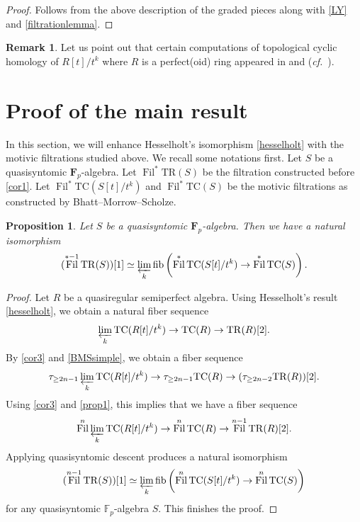 \documentclass[10pt,letterpaper]{amsart}
\numberwithin{figure}{section}
\numberwithin{equation}{section}
\newtheorem{proposition}[figure]{Proposition}
\theoremstyle{definition}
\theoremstyle{definition}
\newtheorem{remark}[figure]{Remark}
\theoremstyle{definition}
\theoremstyle{definition}
\DeclareMathOperator{\Fil}{Fil}
\newcommand{\TR}{\mathrm{TR}}
\newcommand{\TC}{\mathrm{TC}}
\newcommand{\F}{\mathbf{F}}
\begin{document}
\begin{proof}
    Follows from the above description of the graded pieces along with \cref{LY} and \cref{filtrationlemma}. 
\end{proof}{}

\begin{remark}
    Let us point out that certain computations of topological cyclic homology of $R[t]/t^k$ where $R$ is a perfect(oid) ring appeared in \cite{Yuri} and \cite{Noah1} (\textit{cf.}~\cite[Thm.~10.4]{akhill}).
\end{remark}{}


\section{Proof of the main result}\label{finalsec} In this section, we will enhance Hesselholt's isomorphism \cref{hesselholt} with the motivic filtrations studied above. We recall some notations first. Let $S$ be a quasisyntomic $\F_p$-algebra. Let $\Fil^* \TR(S)$ be the filtration constructed before \cref{cor1}. Let $\Fil^*  \TC (S[t]/t^k)$ and $\Fil^* \TC(S)$ be the motivic filtrations as constructed by Bhatt--Morrow--Scholze.



\begin{proposition}\label{mainthm1}
    Let $S$ be a quasisyntomic $\F_p$-algebra. Then  we have a natural isomorphism $$ (\Fil^{*-1} \TR(S))[1] \simeq \varprojlim_k \mathrm{fib} \left(\Fil^* \TC(S[t]/t^k) \to \Fil^* \TC(S)\right).$$
\end{proposition}{}


\begin{proof}
    Let $R$ be a quasiregular semiperfect algebra. Using Hesselholt's result \cref{hesselholt}, we obtain a natural fiber sequence $$ \varprojlim_k \TC (R[t]/t^k) \to \TC(R) \to \TR(R)[2].$$ 
By \cref{cor3} and \cref{BMSsimple}, we obtain a fiber sequence
$$\tau_{\ge 2n-1}  \varprojlim_k \TC (R[t]/t^k) \to \tau_{\ge 2n-1} \TC(R) \to 
(\tau_{\ge 2n-2}\TR(R))[2].$$ Using \cref{cor3} and \cref{prop1}, this implies that we have a fiber sequence
$$\Fil^n \varprojlim_k \TC (R[t]/t^k) \to \Fil^n \TC(R) \to \Fil^{n-1} \TR(R) [2].$$ Applying quasisyntomic descent produces a natural isomorphism $$(\Fil^{n-1} \TR(S))[1] \simeq \varprojlim_k \mathrm{fib} \left(\Fil^n \TC(S[t]/t^k) \to \Fil^n \TC(S)\right)$$ for any quasisyntomic $\mathbb{F}_p$-algebra $S$. This finishes the proof.
\end{proof}{}
\end{document}
